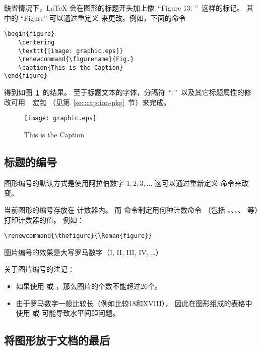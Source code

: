 缺省情况下，\LaTeX{} 会在图形的标题开头加上像~``Figure 13: ''~这样的标记。
其中的 ``Figure'' 可以通过重定义  来更改。例如，下面的命令
\begin{lstlisting}
\begin{figure} 
	\centering 
	\texttt{[image: graphic.eps]} 
	\renewcommand{\figurename}{Fig.} 
	\caption{This is the Caption} 
\end{figure}
\end{lstlisting}
得到如图~\ref{fig:figname}~的结果。
至于标题文本的字体，分隔符~``:''~以及其它标题属性的修改可用~~宏包
（见第~\ref{sec:caption-pkg}~节）来完成。

\begin{figure} 
	\centering 
	\texttt{[image: graphic.eps]} 
	\renewcommand{\figurename}{Fig.} 
	\caption{This is the Caption}\label{fig:figname} 
\end{figure}

\subsection{标题的编号}

图形编号的默认方式是使用阿拉伯数字 $1,2,3,\dots$
这可以通过重新定义  命令来改变。

当前图形的编号存放在  计数器内。
而  命令制定用何种计数命令
（包括 、、、、 等）打印计数器的值。
例如：
\begin{lstlisting}
\renewcommand{\thefigure}{\Roman{figure}}
\end{lstlisting}
图片编号的效果是大写罗马数字（I, II, III, IV, \dots）

关于图片编号的注记：
\begin{itemize}
	\item 如果使用  或 ，那么图片的个数不能超过26个。
	\item 由于罗马数字一般比较长（例如比较18和XVIII），
	因此在图形组成的表格中使用  或  可能导致水平间距问题。
\end{itemize}

\subsection{将图形放于文档的最后}\label{ssec:endfloat}

